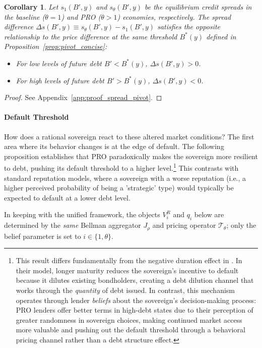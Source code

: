 \documentclass[12pt]{article}
\theoremstyle{plain}
\newtheorem{corollary}{Corollary}
\begin{document}
\begin{corollary}
	\label{cor:spread_pivot}
	Let $s_1(B', y)$ and $s_\theta(B', y)$ be the equilibrium credit spreads in the baseline ($\theta=1$) and PRO ($\theta>1$) economies, respectively. The spread difference $\Delta s(B', y) \equiv s_\theta(B', y) - s_1(B', y)$ satisfies the opposite relationship to the price difference at the same threshold $B^*(y)$ defined in Proposition~\ref{prop:pivot_concise}:
	\begin{itemize}
		\item For low levels of future debt $B' < B^*(y)$, $\Delta s(B', y) > 0$.
		\item For high levels of future debt $B' > B^*(y)$, $\Delta s(B', y) < 0$.
	\end{itemize}
\end{corollary}

\begin{proof}
	See Appendix~\ref{app:proof_spread_pivot}.
\end{proof}

\paragraph{Default Threshold}
How does a rational sovereign react to these altered market conditions? The
first area where its behavior changes is at the edge of default. The following
proposition establishes that PRO paradoxically makes the sovereign more
resilient to debt, pushing its default threshold to a higher
level.\footnote{This result differs fundamentally from the negative duration
	effect in \citep{ChatterjeeEyigungor2012}. In their model, longer maturity
	reduces the sovereign's incentive to default because it dilutes existing
	bondholders, creating a debt dilution channel that works through the
\emph{quantity} of debt issued. In contrast, this mechanism operates through
	lender \emph{beliefs} about the sovereign's decision-making process: PRO
	lenders offer better terms in high-debt states due to their perception of
	greater randomness in sovereign choices, making continued market access more
	valuable and pushing out the default threshold through a behavioral pricing
	channel rather than a debt structure effect.} This contrasts with standard
reputation models, where a sovereign with a worse reputation (i.e., a higher
perceived probability of being a 'strategic' type) would typically be expected
to default at a lower debt level.

In keeping with the unified framework, the objects $V^R_i$ and $q_i$ below are
determined by the \emph{same} Bellman aggregator $J_\rho$ and pricing operator
$\mathcal T_\theta$; only the belief parameter is set to $i\in\{1,\theta\}$.
\end{document}
